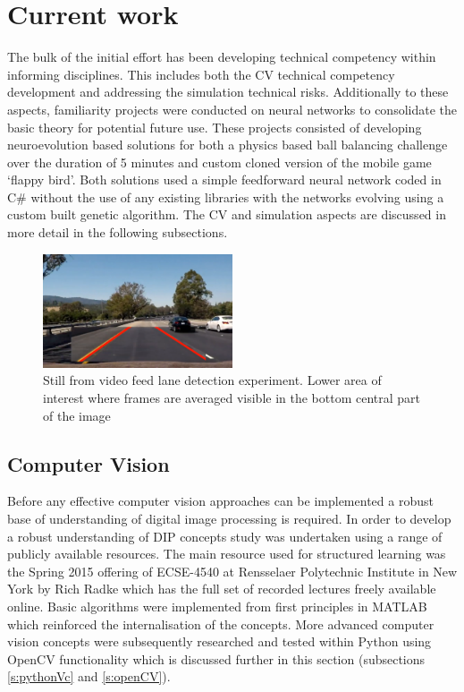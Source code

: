 \documentclass[]{aiaa-tc}%
\begin{document}
\section{Current work}

The bulk of the initial effort has been developing technical competency within informing disciplines. This includes both the CV technical competency development and addressing the simulation technical risks. Additionally to these aspects, familiarity projects were conducted on neural networks to consolidate the basic theory for potential future use. These projects consisted of developing neuroevolution based solutions for both a physics based ball balancing challenge over the duration of 5 minutes and custom cloned version of the mobile game `flappy bird'. Both solutions used a simple feedforward neural network coded in C\# without the use of any existing libraries with the networks evolving using a custom built genetic algorithm. The CV and simulation aspects are discussed in more detail in the following subsections.

\begin{figure} %
	\centering
	\includegraphics[width=0.5\textwidth, height=0.5\textwidth]{early_lane_detection_experiment.png}
	\caption{Still from video feed lane detection experiment. Lower area of interest where frames are averaged visible in the bottom central part of the image}
	\label{f:simpleLaneDetectionHough}
\end{figure}
\subsection{Computer Vision}\label{s:currentWork_CV}


Before any effective computer vision approaches can be implemented a robust base of understanding of digital image processing is required. In order to develop a robust understanding of DIP concepts study was undertaken using a range of publicly available resources. The main resource used for structured learning was the Spring 2015 offering of ECSE-4540 at Rensselaer Polytechnic Institute in New York by Rich Radke which has the full set of recorded lectures freely available online. Basic algorithms were implemented from first principles in MATLAB which reinforced the internalisation of the concepts. More advanced computer vision concepts were subsequently researched and tested within Python using OpenCV functionality which is discussed further in this section (subsections \ref{s:pythonVc} and \ref{s:openCV}). 
\end{document}
